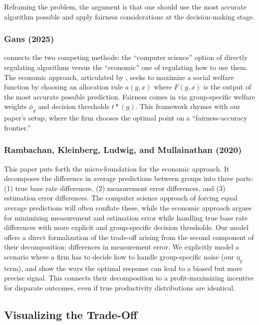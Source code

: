 Reframing the problem, the argument is that one should use the most accurate algorithm possible and apply fairness considerations at the decision-making stage.

\subsubsection{Gans (2025)}

\citet{Gans2025} connects the two competing methods: the ``computer science'' option of directly regulating algorithms versus the ``economic'' one of regulating how to use them. The economic approach, articulated by \citet{Rambachan2020}, seeks to maximize a social welfare function by choosing an allocation rule $a(g,x)$ where $F(g,x)$ is the output of the most accurate possible prediction. Fairness comes in via group-specific welfare weights $\phi_g$ and decision thresholds $t*(g)$. This framework rhymes with our paper's setup, where the firm chooses the optimal point on a ``fairness-accuracy frontier.'' 

\subsubsection{Rambachan, Kleinberg, Ludwig, and Mullainathan (2020)}

This paper puts forth the micro-foundation for the economic approach. It decomposes the difference in average predictions between groups into three parts: (1) true base rate differences, (2) measurement error differences, and (3) estimation error differences. The computer science approach of forcing equal average predictions will often conflate these, while the economic approach argues for minimizing measurement and estimation error while handling true base rate differences with more explicit and group-specific decision thresholds. Our model offers a direct formalization of the trade-off arising from the second component of their decomposition: differences in measurement error. We explicitly model a scenario where a firm has to decide how to handle group-specific noise (our $\eta_g$ term), and show the ways the optimal response can lead to a biased but more precise signal. This connects their decomposition to a profit-maximizing incentive for disparate outcomes, even if true productivity distributions are identical.

\subsection{Visualizing the Trade-Off}

